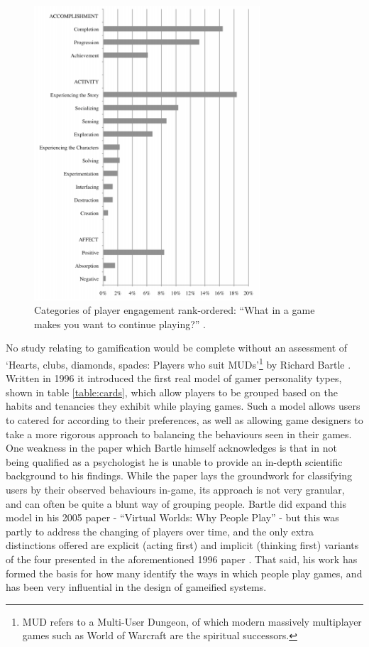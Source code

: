 \documentclass[12pt,a4paper,twoside]{report}
\begin{document}
\begin{figure}
\begin{center}
	\includegraphics[width=0.75\textwidth]{../img/fog.png}
	\caption{Categories of player engagement rank-ordered: ``What in a game makes you want to continue playing?'' \cite{schoenau2011player}.}
	\label{fog}
\end{center}
\end{figure}

No study relating to gamification would be complete without an assessment of `Hearts, clubs, diamonds, spades: Players who suit MUDs'\footnote{MUD refers to a Multi-User Dungeon, of which modern massively multiplayer games such as World of Warcraft are the spiritual successors.} by Richard Bartle \cite{bartle1996hearts}. Written in 1996 it introduced the first real model of gamer personality types, shown in table \ref{table:cards}, which allow players to be grouped based on the habits and tenancies they exhibit while playing games. Such a model allows users to catered for according to their preferences, as well as allowing game designers to take a more rigorous approach to balancing the behaviours seen in their games.  One weakness in the paper which Bartle himself acknowledges is that in not being qualified as a psychologist he is unable to provide an in-depth scientific background to his findings. While the paper lays the groundwork for classifying users by their observed behaviours in-game, its approach is not very granular, and can often be quite a blunt way of grouping people. Bartle did expand this model in his 2005 paper - ``Virtual Worlds: Why People Play'' \cite{bartle2005play} - but this was partly to address the changing of players over time, and the only extra distinctions offered are explicit (acting first) and implicit (thinking first) variants of the four presented in the aforementioned 1996 paper \cite{bartle2005play}. That said, his work has formed the basis for how many identify the ways in which people play games, and has been very influential in the design of gameified systems.
\end{document}

